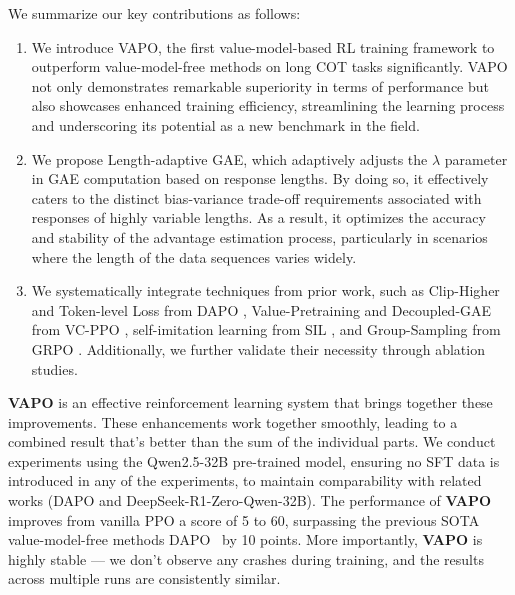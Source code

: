 We summarize our key contributions as follows:
\begin{enumerate}
\item We introduce VAPO, the first value-model-based RL training framework to outperform value-model-free methods on long COT tasks significantly. VAPO not only demonstrates remarkable superiority in terms of performance but also showcases enhanced training efficiency, streamlining the learning process and underscoring its potential as a new benchmark in the field.
\item We propose Length-adaptive GAE, which adaptively adjusts the $\lambda$ parameter in GAE computation based on response lengths. By doing so, it effectively caters to the distinct bias-variance trade-off requirements associated with responses of highly variable lengths. As a result, it optimizes the accuracy and stability of the advantage estimation process, particularly in scenarios where the length of the data sequences varies widely.
\item We systematically integrate techniques from prior work, such as Clip-Higher and Token-level Loss from DAPO \citep{dapo}, Value-Pretraining and Decoupled-GAE from VC-PPO \citep{vc-ppo}, self-imitation learning from SIL \citep{SIL}, and Group-Sampling from GRPO \citep{shao2024deepseekmath}. Additionally, we further validate their necessity through ablation studies.

\end{enumerate}
 \textbf{VAPO} is an effective reinforcement learning system that brings together these improvements. These enhancements work together smoothly, leading to a combined result that’s better than the sum of the individual parts. 
 We conduct experiments using the Qwen2.5-32B pre-trained model, ensuring no SFT data is introduced in any of the experiments, to maintain comparability with related works (DAPO and DeepSeek-R1-Zero-Qwen-32B).
 The performance of \textbf{VAPO} improves from vanilla PPO a score of 5 to 60, surpassing the previous SOTA value-model-free methods DAPO~\cite{dapo} by 10 points. More importantly, \textbf{VAPO} is highly stable — we don't observe any crashes during training, and the results across multiple runs are consistently similar.


